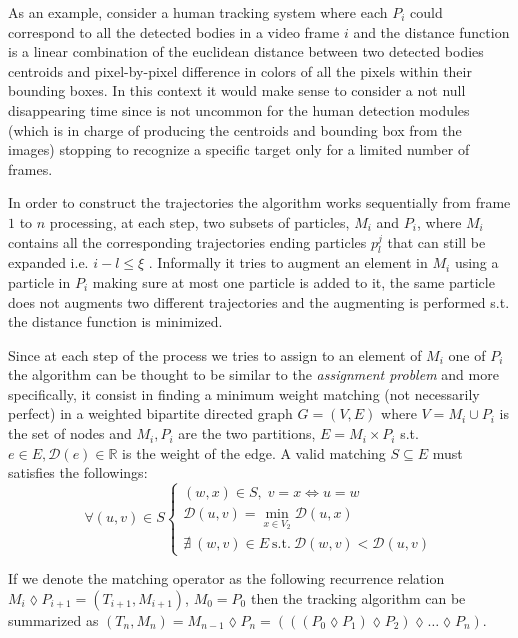 \documentclass[conference]{IEEEtran}
\begin{document}
As an example, consider a human tracking system where each $P_i$ could correspond to all the detected bodies in a  video frame $i$ and the distance function is a linear combination of the euclidean distance between two detected bodies centroids  and pixel-by-pixel difference in colors of all the pixels within their bounding boxes. In this context it would make sense to consider a not null disappearing time since is not uncommon for the human detection modules (which is in charge of producing the centroids and bounding box from the images) stopping to recognize a specific target only for a limited number of frames. 





In order to construct the trajectories the algorithm works sequentially from frame $1$ to $n$ processing, at each step, two subsets of particles, $M_i$ and $P_{i}$, where $M_i$ contains all the corresponding trajectories ending particles $p^{j}_l$ that can still be expanded i.e. $i-l \leq \xi$ .
Informally it tries to augment an element in $M_i$ using a particle in $P_i$ making sure at most one particle is added to it, the same particle does not augments two different trajectories and the augmenting is performed s.t. the distance function is minimized.

Since at each step of the process we tries to assign to an element of $M_i$ one of $P_i$ the algorithm can be thought to be similar to the \textit{assignment problem} \cite{bellmann1978} and more specifically, it consist in finding a minimum weight matching (not necessarily perfect) in  a weighted bipartite directed graph $G=(V,E)$ where $V={M_i} \cup P_i$ is the set of nodes and ${M_i}, P_i$ are the two partitions, $E = {M_i} \times P_i$ s.t. $e \in E, \mathcal{D}(e) \in \mathbb{R}$ is the weight of the edge.
A valid matching $S \subseteq E$ must satisfies the followings: 
\[ \forall (u,v) \in S 
\left\{
  \begin{array}{lr}
   (w,x) \in S,\; v=x\Longleftrightarrow u=w\\
   \mathcal{D}(u,v) = \min_{x \in V_2} \mathcal{D}(u,x)  \\
    \nexists \: (w,v) \in E \: \mbox{s.t.} \: \mathcal{D}(w,v) < \mathcal{D}(u,v)
  \end{array}
\right.
\]

If we denote the matching operator  as the following recurrence relation $  M_i \lozenge P_{i+1} = (T_{i+1},M_{i+1}) $, $M_0=P_0$ then the  tracking algorithm can be summarized as $(T_n,M_n) = M_{n-1} \lozenge P_{n}=(((P_0 \lozenge P_1)\lozenge P_2) \lozenge \ldots \lozenge P_n)$.
\end{document}
